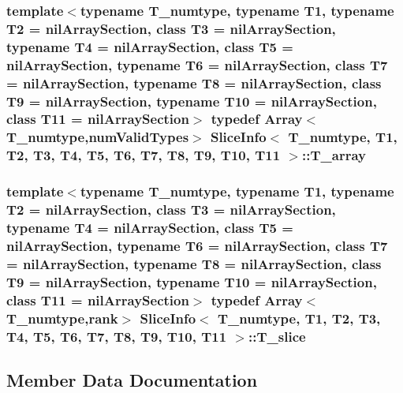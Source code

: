 \subsubsection[{T\+\_\+array}]{\setlength{\rightskip}{0pt plus 5cm}template$<$typename T\+\_\+numtype, typename T1, typename T2 = nil\+Array\+Section, class T3  = nil\+Array\+Section, typename T4  = nil\+Array\+Section, class T5  = nil\+Array\+Section, typename T6  = nil\+Array\+Section, class T7  = nil\+Array\+Section, typename T8  = nil\+Array\+Section, class T9  = nil\+Array\+Section, typename T10  = nil\+Array\+Section, class T11  = nil\+Array\+Section$>$ typedef {\bf Array}$<$T\+\_\+numtype,{\bf num\+Valid\+Types}$>$ {\bf Slice\+Info}$<$ T\+\_\+numtype, T1, T2, T3, T4, T5, T6, T7, T8, T9, T10, T11 $>$\+::{\bf T\+\_\+array}}\label{classSliceInfo_a4b4e488c55e60568f80f246e97ab8b65}
\hypertarget{classSliceInfo_a6e50b9cc2f3ab62b8d3c8b59f86a2037}{}
\subsubsection[{T\+\_\+slice}]{\setlength{\rightskip}{0pt plus 5cm}template$<$typename T\+\_\+numtype, typename T1, typename T2 = nil\+Array\+Section, class T3  = nil\+Array\+Section, typename T4  = nil\+Array\+Section, class T5  = nil\+Array\+Section, typename T6  = nil\+Array\+Section, class T7  = nil\+Array\+Section, typename T8  = nil\+Array\+Section, class T9  = nil\+Array\+Section, typename T10  = nil\+Array\+Section, class T11  = nil\+Array\+Section$>$ typedef {\bf Array}$<$T\+\_\+numtype,{\bf rank}$>$ {\bf Slice\+Info}$<$ T\+\_\+numtype, T1, T2, T3, T4, T5, T6, T7, T8, T9, T10, T11 $>$\+::{\bf T\+\_\+slice}}\label{classSliceInfo_a6e50b9cc2f3ab62b8d3c8b59f86a2037}


\subsection{Member Data Documentation}
\hypertarget{classSliceInfo_ae58323255323aec3392d4ef776060173}{}
